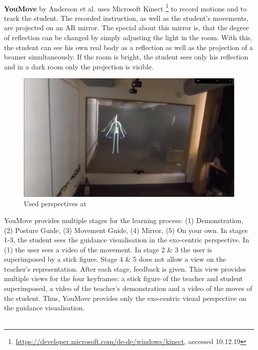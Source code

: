 $ $\\
\textbf{YouMove} by Anderson et al. \cite{Anderson2013a} uses Microsoft Kinect \footnote{\hyperlink{https://developer.microsoft.com/de-de/windows/kinect}{https://developer.microsoft.com/de-de/windows/kinect}, accessed 10.12.19} to record motions and to track the student. The recorded instruction, as well as the student's movements, are projected on an AR mirror. The special about this mirror is, that the degree of reflection can be changed by simply adjusting the light in the room. With this, the student can see his own real body as a reflection as well as the projection of a beamer simultaneously. If the room is bright, the student sees only his reflection and in a dark room only the projection is visible.\\ 
\begin{figure}
	\centering
	\includegraphics[width=1.0\textwidth]{img/YouMove.png}
	\caption{Used perspectives at \cite{Anderson2013a}}
	\label{fig:youmovePerspectives}
\end{figure}
YouMove provides multiple stages for the learning process: (1) Demonstration, (2) Posture Guide, (3) Movement Guide, (4) Mirror, (5) On your own. In stages 1-3, the student sees the guidance visualisation in the exo-centric perspective. In (1) the user sees a video of the movement. In stage 2 \& 3 the user is superimposed by a stick figure. Stage 4 \& 5 does not allow a view on the teacher's representation. After each stage, feedback is given. This view provides multiple views for the four keyframes: a stick figure of the teacher and student superimposed, a video of the teacher's demonstration and a video of the moves of the student. Thus, YouMove provides only the exo-centric visual perspective on the guidance visualisation.\\ \\
